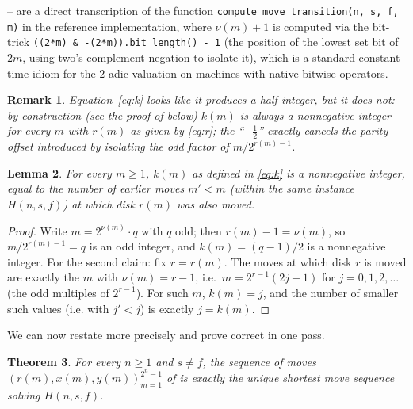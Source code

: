 \documentclass[11pt]{article}
\newtheorem{theorem}{Theorem}
\newtheorem{lemma}[theorem]{Lemma}
\newtheorem{remark}[theorem]{Remark}
\begin{document}
\begin{sloppypar}
-- are a direct transcription of the function
\texttt{compute\_move\_transition(n, s, f, m)} in the reference
implementation, where $\nu(m)+1$ is computed via the bit-trick
\texttt{((2*m) \& -(2*m)).bit\_length() - 1} (the position of the lowest set
bit of $2m$, using two's-complement negation to isolate it), which is a
standard constant-time idiom for the $2$-adic valuation on machines with
native bitwise operators.
\end{sloppypar}

\begin{remark}
Equation~\eqref{eq:k} looks like it produces a half-integer, but it does
not: by construction (see the proof of  below) $k(m)$ is
always a nonnegative integer for every $m$ with $r(m)$ as given by
\eqref{eq:r}; the ``$-\tfrac12$'' exactly cancels the parity offset
introduced by isolating the odd factor of $m/2^{r(m)-1}$.
\end{remark}

\begin{lemma}
\label{lem:k-integer}
For every $m \ge 1$, $k(m)$ as defined in \eqref{eq:k} is a nonnegative
integer, equal to the number of earlier moves $m' < m$ (within the same
instance $H(n,s,f)$) at which disk $r(m)$ was also moved.
\end{lemma}

\begin{proof}
Write $m = 2^{\nu(m)} \cdot q$ with $q$ odd; then $r(m) - 1 = \nu(m)$, so
$m / 2^{r(m)-1} = q$ is an odd integer, and $k(m) = (q-1)/2$ is a
nonnegative integer. For the second claim: fix $r = r(m)$. The moves at
which disk $r$ is moved are exactly the $m$ with $\nu(m) = r-1$, i.e.\
$m = 2^{r-1}(2j+1)$ for $j = 0, 1, 2, \dots$ (the odd multiples of
$2^{r-1}$). For such $m$, $k(m) = j$, and the number of smaller such values
(i.e. with $j' < j$) is exactly $j = k(m)$.
\end{proof}

We can now restate  more precisely and prove
\Cref{def:formula} correct in one pass.

\begin{theorem}
\label{thm:formula}
For every $n \ge 1$ and $s \ne f$, the sequence of moves
$(r(m), x(m), y(m))_{m=1}^{2^n-1}$ of  is exactly the
unique shortest move sequence solving $H(n,s,f)$.
\end{theorem}
\end{document}

